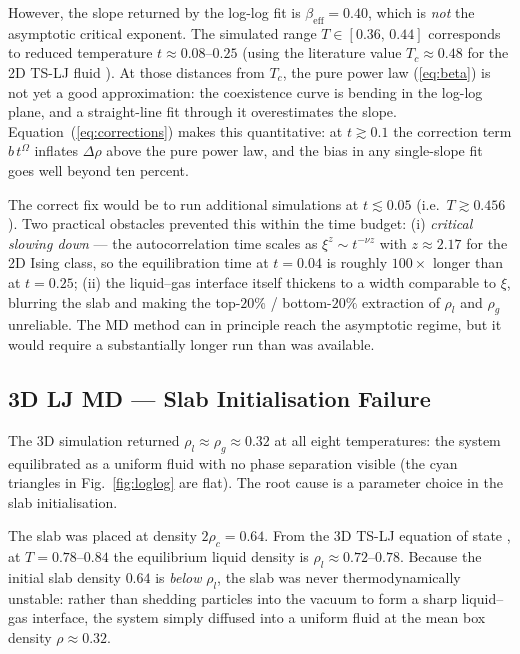\documentclass[12pt,a4paper]{article}
\begin{document}
However, the slope returned by the log-log fit is $\beta_\mathrm{eff} = 0.40$, which is
\emph{not} the asymptotic critical exponent. The simulated range $T \in [0.36,\, 0.44]$
corresponds to reduced temperature $t \approx 0.08$--$0.25$ (using the literature value
$T_c \approx 0.48$ for the 2D TS-LJ fluid \cite{smit2d}). At those distances from
$T_c$, the pure power law (\ref{eq:beta}) is not yet a good approximation: the
coexistence curve is bending in the log-log plane, and a straight-line fit through it
overestimates the slope. Equation~(\ref{eq:corrections}) makes this quantitative: at
$t \gtrsim 0.1$ the correction term $b\,t^\Omega$ inflates $\Delta\rho$ above the pure
power law, and the bias in any single-slope fit goes well beyond ten percent.

The correct fix would be to run additional simulations at $t \lesssim 0.05$ (i.e.\ $T
\gtrsim 0.456$). Two practical obstacles prevented this within the time budget: (i)
\emph{critical slowing down} — the autocorrelation time scales as $\xi^z \sim t^{-\nu z}$
with $z \approx 2.17$ for the 2D Ising class, so the equilibration time at $t = 0.04$ is
roughly $100\times$ longer than at $t = 0.25$; (ii) the liquid--gas interface itself
thickens to a width comparable to $\xi$, blurring the slab and making the top-$20\%$ /
bottom-$20\%$ extraction of $\rho_l$ and $\rho_g$ unreliable. The MD method can in
principle reach the asymptotic regime, but it would require a substantially longer run
than was available.

\subsection{3D LJ MD --- Slab Initialisation Failure}

The 3D simulation returned $\rho_l \approx \rho_g \approx 0.32$ at all eight temperatures:
the system equilibrated as a uniform fluid with no phase separation visible (the cyan
triangles in Fig.~\ref{fig:loglog} are flat). The root cause is a parameter choice in
the slab initialisation.

The slab was placed at density $2\rho_c = 0.64$. From the 3D TS-LJ equation of state
\cite{johnson}, at $T = 0.78$--$0.84$ the equilibrium liquid density is $\rho_l \approx
0.72$--$0.78$. Because the initial slab density $0.64$ is \emph{below} $\rho_l$, the slab
was never thermodynamically unstable: rather than shedding particles into the vacuum to
form a sharp liquid--gas interface, the system simply diffused into a uniform fluid at
the mean box density $\rho \approx 0.32$.
\end{document}
